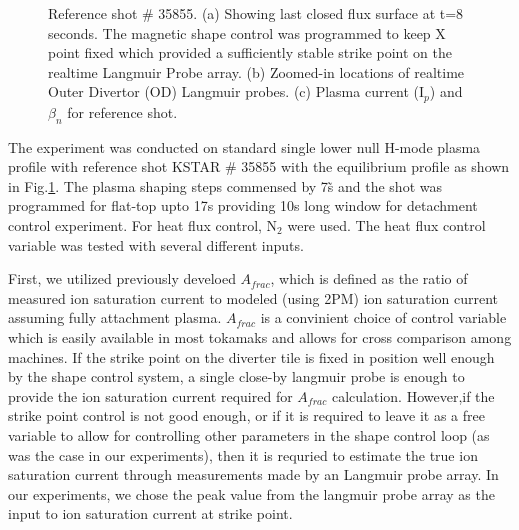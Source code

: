 \begin{figure}[!ht]
 \caption{Reference shot \# 35855. (a) Showing last closed flux surface at t=8 seconds. The magnetic shape control was programmed to keep X point fixed which provided a sufficiently stable strike point on the realtime Langmuir Probe array. (b) Zoomed-in locations of realtime Outer Divertor (OD) Langmuir probes. (c) Plasma current (I$_p$) and $\beta_n$ for reference shot.}
 \label{fig:ref_shot}
\end{figure}

The experiment was conducted on standard single lower null H-mode plasma profile with reference shot KSTAR \# 35855 with the equilibrium profile as shown in Fig.\ref{fig:ref_shot}. The plasma shaping steps commensed by 7\~s and the shot was programmed for flat-top upto 17s providing 10s long window for detachment control experiment. For heat flux control, N$_2$  were used. The heat flux control variable was tested with several different inputs.

First, we utilized previously develoed $A_{frac}$\cite{Eldon_2022_PPCF}, which is defined as the ratio of measured ion saturation current to modeled (using 2PM\cite{Leonard_2018_PPCF}) ion saturation current assuming fully attachment plasma. $A_{frac}$ is a convinient choice of control variable which is easily available in most tokamaks and allows for cross comparison among machines. If the strike point on the diverter tile is fixed in position well enough by the shape control system, a single close-by langmuir probe is enough to provide the ion saturation current required for $A_{frac}$ calculation. However,if the strike point control is not good enough, or if it is required to leave it as a free variable to allow for controlling other parameters in the shape control loop (as was the case in our experiments), then it is requried to estimate the true ion saturation current through measurements made by an Langmuir probe array. In our experiments, we chose the peak value from the langmuir probe array as the input to ion saturation current at strike point.

